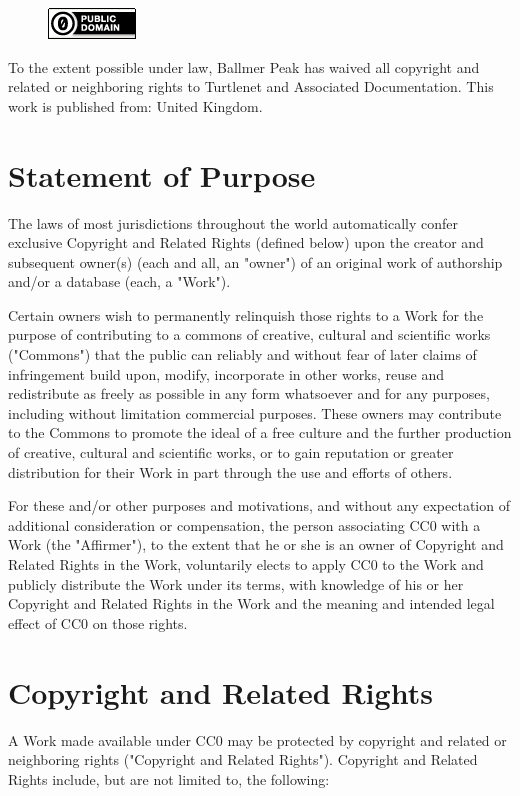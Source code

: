 \label{licence}
\begin{figure}[h]
    \centering
    \includegraphics{images/appendicies/licence.png}
\end{figure}

\begin{center}
To the extent possible under law, Ballmer Peak has waived all copyright and
related or neighboring rights to Turtlenet and Associated Documentation. This
work is published from: United Kingdom.
\end{center}

\section {Statement of Purpose}
The laws of most jurisdictions throughout the world automatically confer
exclusive Copyright and Related Rights (defined below) upon the creator and
subsequent owner(s) (each and all, an "owner") of an original work of authorship
and/or a database (each, a "Work").

Certain owners wish to permanently relinquish those rights to a Work for the
purpose of contributing to a commons of creative, cultural and scientific works
("Commons") that the public can reliably and without fear of later claims of
infringement build upon, modify, incorporate in other works, reuse and
redistribute as freely as possible in any form whatsoever and for any purposes,
including without limitation commercial purposes. These owners may contribute to
the Commons to promote the ideal of a free culture and the further production of
creative, cultural and scientific works, or to gain reputation or greater
distribution for their Work in part through the use and efforts of others.

For these and/or other purposes and motivations, and without any expectation of
additional consideration or compensation, the person associating CC0 with a Work
(the "Affirmer"), to the extent that he or she is an owner of Copyright and
Related Rights in the Work, voluntarily elects to apply CC0 to the Work and
publicly distribute the Work under its terms, with knowledge of his or her
Copyright and Related Rights in the Work and the meaning and intended legal
effect of CC0 on those rights.

\section{Copyright and Related Rights}
A Work made available under CC0 may be protected by copyright and related or
neighboring rights ("Copyright and Related Rights"). Copyright and Related
Rights include, but are not limited to, the following:

